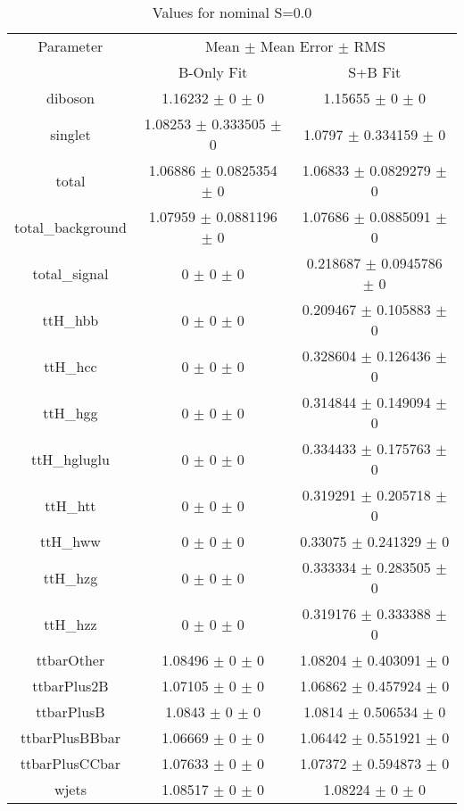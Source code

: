 \begin{table}
\centering
\caption{Values for nominal S=0.0}
\begin{tabular}{ccc}
\toprule
Parameter & \multicolumn{2}{c}{Mean $\pm$ Mean Error $\pm$ RMS}\\
 & B-Only Fit & S+B Fit\\
\midrule
diboson & \num{1.16232} $\pm$ \num{0} $\pm$ \num{0} & \num{1.15655} $\pm$ \num{0} $\pm$ \num{0}\\
singlet & \num{1.08253} $\pm$ \num{0.333505} $\pm$ \num{0} & \num{1.0797} $\pm$ \num{0.334159} $\pm$ \num{0}\\
total & \num{1.06886} $\pm$ \num{0.0825354} $\pm$ \num{0} & \num{1.06833} $\pm$ \num{0.0829279} $\pm$ \num{0}\\
total\_background & \num{1.07959} $\pm$ \num{0.0881196} $\pm$ \num{0} & \num{1.07686} $\pm$ \num{0.0885091} $\pm$ \num{0}\\
total\_signal & \num{0} $\pm$ \num{0} $\pm$ \num{0} & \num{0.218687} $\pm$ \num{0.0945786} $\pm$ \num{0}\\
ttH\_hbb & \num{0} $\pm$ \num{0} $\pm$ \num{0} & \num{0.209467} $\pm$ \num{0.105883} $\pm$ \num{0}\\
ttH\_hcc & \num{0} $\pm$ \num{0} $\pm$ \num{0} & \num{0.328604} $\pm$ \num{0.126436} $\pm$ \num{0}\\
ttH\_hgg & \num{0} $\pm$ \num{0} $\pm$ \num{0} & \num{0.314844} $\pm$ \num{0.149094} $\pm$ \num{0}\\
ttH\_hgluglu & \num{0} $\pm$ \num{0} $\pm$ \num{0} & \num{0.334433} $\pm$ \num{0.175763} $\pm$ \num{0}\\
ttH\_htt & \num{0} $\pm$ \num{0} $\pm$ \num{0} & \num{0.319291} $\pm$ \num{0.205718} $\pm$ \num{0}\\
ttH\_hww & \num{0} $\pm$ \num{0} $\pm$ \num{0} & \num{0.33075} $\pm$ \num{0.241329} $\pm$ \num{0}\\
ttH\_hzg & \num{0} $\pm$ \num{0} $\pm$ \num{0} & \num{0.333334} $\pm$ \num{0.283505} $\pm$ \num{0}\\
ttH\_hzz & \num{0} $\pm$ \num{0} $\pm$ \num{0} & \num{0.319176} $\pm$ \num{0.333388} $\pm$ \num{0}\\
ttbarOther & \num{1.08496} $\pm$ \num{0} $\pm$ \num{0} & \num{1.08204} $\pm$ \num{0.403091} $\pm$ \num{0}\\
ttbarPlus2B & \num{1.07105} $\pm$ \num{0} $\pm$ \num{0} & \num{1.06862} $\pm$ \num{0.457924} $\pm$ \num{0}\\
ttbarPlusB & \num{1.0843} $\pm$ \num{0} $\pm$ \num{0} & \num{1.0814} $\pm$ \num{0.506534} $\pm$ \num{0}\\
ttbarPlusBBbar & \num{1.06669} $\pm$ \num{0} $\pm$ \num{0} & \num{1.06442} $\pm$ \num{0.551921} $\pm$ \num{0}\\
ttbarPlusCCbar & \num{1.07633} $\pm$ \num{0} $\pm$ \num{0} & \num{1.07372} $\pm$ \num{0.594873} $\pm$ \num{0}\\
wjets & \num{1.08517} $\pm$ \num{0} $\pm$ \num{0} & \num{1.08224} $\pm$ \num{0} $\pm$ \num{0}\\
\bottomrule
\end{tabular}
\end{table}